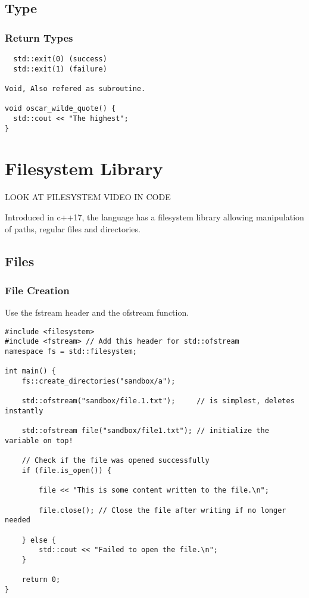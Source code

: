 \documentclass[openany]{report}
\begin{document}
\section{Type}

\subsection{Return Types}

\begin{verbatim}
  std::exit(0) (success)
  std::exit(1) (failure)

Void, Also refered as subroutine.

void oscar_wilde_quote() {
  std::cout << "The highest";
}
\end{verbatim}

\chapter{Filesystem Library}

LOOK AT FILESYSTEM VIDEO IN CODE

Introduced in c++17, the language has a filesystem library allowing
manipulation of paths, regular files and directories.

\section{Files}

\subsection{File Creation}

Use the fstream header and the ofstream function.

\begin{verbatim}
#include <filesystem>
#include <fstream> // Add this header for std::ofstream
namespace fs = std::filesystem;

int main() {
    fs::create_directories("sandbox/a");

    std::ofstream("sandbox/file.1.txt");     // is simplest, deletes instantly

    std::ofstream file("sandbox/file1.txt"); // initialize the variable on top!

    // Check if the file was opened successfully
    if (file.is_open()) {

        file << "This is some content written to the file.\n";

        file.close(); // Close the file after writing if no longer needed

    } else {
        std::cout << "Failed to open the file.\n";
    }

    return 0;
}
\end{verbatim}
\end{document}
